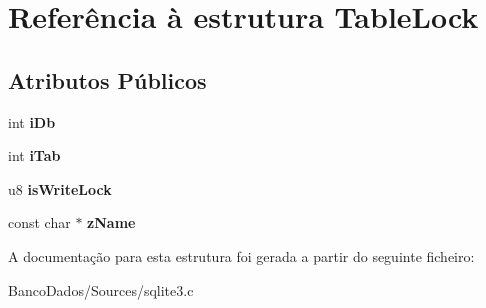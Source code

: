 \hypertarget{struct_table_lock}{\section{Referência à estrutura Table\-Lock}
\label{struct_table_lock}
}
\subsection*{Atributos Públicos}
\begin{DoxyCompactItemize}
\item 
\hypertarget{struct_table_lock_ad5cc726ef29ffcca39ec0b72942513f6}{int {\bfseries i\-Db}}\label{struct_table_lock_ad5cc726ef29ffcca39ec0b72942513f6}

\item 
\hypertarget{struct_table_lock_ab25b5d9ba21ed96ed68ce8064ff84e24}{int {\bfseries i\-Tab}}\label{struct_table_lock_ab25b5d9ba21ed96ed68ce8064ff84e24}

\item 
\hypertarget{struct_table_lock_a171121af9886ee08044d4b82b991ceeb}{u8 {\bfseries is\-Write\-Lock}}\label{struct_table_lock_a171121af9886ee08044d4b82b991ceeb}

\item 
\hypertarget{struct_table_lock_ad1ce077fbd2600dd6d23ec08706dd227}{const char $\ast$ {\bfseries z\-Name}}\label{struct_table_lock_ad1ce077fbd2600dd6d23ec08706dd227}

\end{DoxyCompactItemize}


A documentação para esta estrutura foi gerada a partir do seguinte ficheiro\-:\begin{DoxyCompactItemize}
\item 
Banco\-Dados/\-Sources/sqlite3.\-c\end{DoxyCompactItemize}
